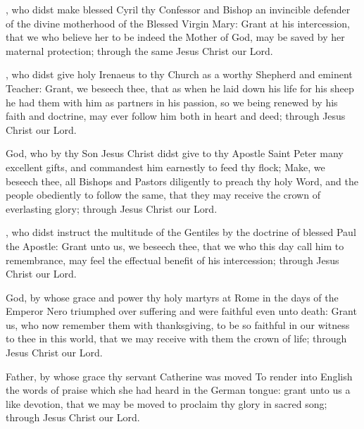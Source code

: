 , who didst make blessed Cyril thy Confessor and Bishop an invincible defender of the divine motherhood of the Blessed Virgin Mary: Grant at his intercession, that we who believe her to be indeed the Mother of God, may be saved by her maternal protection; through the same Jesus Christ our Lord.

, who didst give holy Irenaeus to thy Church as a worthy Shepherd and eminent Teacher: Grant, we beseech thee, that as when he laid down his life for his sheep he had them with him as partners in his passion, so we being renewed by his faith and doctrine, may ever follow him both in heart and deed; through Jesus Christ our Lord.

 God, who by thy Son Jesus Christ didst give to thy Apostle Saint Peter many excellent gifts, and commandest him earnestly to feed thy flock; Make, we beseech thee, all Bishops and Pastors diligently to preach thy holy Word, and the people obediently to follow the same, that they may receive the crown of everlasting glory; through Jesus Christ our Lord.

, who didst instruct the multitude of the Gentiles by the doctrine of blessed Paul the Apostle: Grant unto us, we beseech thee, that we who this day call him to remembrance, may feel the effectual benefit of his intercession; through Jesus Christ our Lord.

 God, by whose grace and power thy holy martyrs at Rome in the days of the Emperor Nero triumphed over suffering and were faithful even unto death:  Grant us, who now remember them with thanksgiving, to be so faithful in our witness to thee in this world, that we may receive with them the crown of life; through Jesus Christ our Lord.

 Father, by whose grace thy servant Catherine was moved To render into English the words of praise which she had heard in the German tongue: grant unto us a like devotion, that we may be moved to proclaim thy glory in sacred song; through Jesus Christ our Lord.

